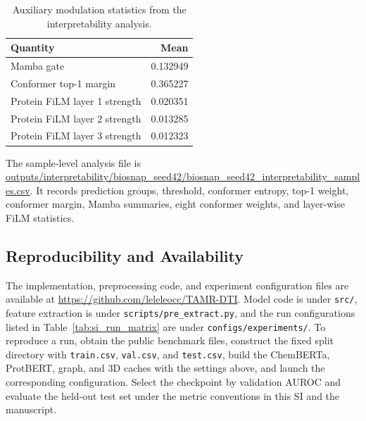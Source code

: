 \begin{table}[!htbp]
\centering
\caption{Auxiliary modulation statistics from the interpretability analysis.}
\label{tab:si_auxiliary_modulation}
\begin{tabular}{lr}
\toprule
Quantity & Mean \\
\midrule
Mamba gate & 0.132949 \\
Conformer top-1 margin & 0.365227 \\
Protein FiLM layer 1 strength & 0.020351 \\
Protein FiLM layer 2 strength & 0.013285 \\
Protein FiLM layer 3 strength & 0.012323 \\
\bottomrule
\end{tabular}
\end{table}

The sample-level analysis file is
\url{outputs/interpretability/biosnap_seed42/biosnap_seed42_interpretability_samples.csv}.
It records prediction groups, threshold, conformer entropy, top-1 weight,
conformer margin, Mamba summaries, eight conformer weights, and layer-wise FiLM
statistics.

\subsection{Reproducibility and Availability}

The implementation, preprocessing code, and experiment configuration files are
available at \url{https://github.com/leleleocc/TAMR-DTI}. Model code is under
\texttt{src/}, feature extraction is under \texttt{scripts/pre\_extract.py},
and the run configurations listed in Table~\ref{tab:si_run_matrix} are under
\texttt{configs/experiments/}. To reproduce a run, obtain the public benchmark
files, construct the fixed split directory with \texttt{train.csv},
\texttt{val.csv}, and \texttt{test.csv}, build the ChemBERTa, ProtBERT, graph,
and 3D caches with the settings above, and launch the corresponding
configuration. Select the checkpoint by validation AUROC and evaluate the
held-out test set under the metric conventions in this SI and the manuscript.
